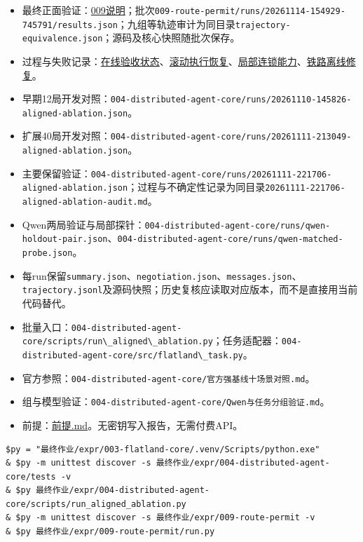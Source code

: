 \begin{itemize}
\item
  最终正面验证：\href{../expr/009-route-permit/README.md}{009说明}；批次\passthrough{\lstinline!009-route-permit/runs/20261114-154929-745791/results.json!}；九组等轨迹审计为同目录\passthrough{\lstinline!trajectory-equivalence.json!}；源码及核心快照随批次保存。
\item
  过程与失败记录：\href{../expr/006-mpc-flatland/在线验收状态.md}{在线验收状态}、\href{../expr/006-mpc-flatland/滚动执行恢复验收.md}{滚动执行恢复}、\href{../expr/007-local-chain/README.md}{局部连锁能力}、\href{../expr/008-flatland-local-repair/README.md}{铁路离线修复}。
\item
  早期12局开发对照：\passthrough{\lstinline!004-distributed-agent-core/runs/20261110-145826-aligned-ablation.json!}。
\item
  扩展40局开发对照：\passthrough{\lstinline!004-distributed-agent-core/runs/20261111-213049-aligned-ablation.json!}。
\item
  主要保留验证：\passthrough{\lstinline!004-distributed-agent-core/runs/20261111-221706-aligned-ablation.json!}；过程与不确定性记录为同目录\passthrough{\lstinline!20261111-221706-aligned-ablation-audit.md!}。
\item
  Qwen两局验证与局部探针：\passthrough{\lstinline!004-distributed-agent-core/runs/qwen-holdout-pair.json!}、\passthrough{\lstinline!004-distributed-agent-core/runs/qwen-matched-probe.json!}。
\item
  每run保留\passthrough{\lstinline!summary.json!}、\passthrough{\lstinline!negotiation.json!}、\passthrough{\lstinline!messages.json!}、\passthrough{\lstinline!trajectory.jsonl!}及源码快照；历史复核应读取对应版本，而不是直接用当前代码替代。
\item
  批量入口：\passthrough{\lstinline!004-distributed-agent-core/scripts/run\_aligned\_ablation.py!}；任务适配器：\passthrough{\lstinline!004-distributed-agent-core/src/flatland\_task.py!}。
\item
  官方参照：\passthrough{\lstinline!004-distributed-agent-core/官方强基线十场景对照.md!}。
\item
  组与模型验证：\passthrough{\lstinline!004-distributed-agent-core/Qwen与任务分组验证.md!}。
\item
  前提：\href{../expr/前提.md}{前提.md}。无密钥写入报告，无需付费API。
\end{itemize}

\begin{lstlisting}
$py = "最终作业/expr/003-flatland-core/.venv/Scripts/python.exe"
& $py -m unittest discover -s 最终作业/expr/004-distributed-agent-core/tests -v
& $py 最终作业/expr/004-distributed-agent-core/scripts/run_aligned_ablation.py
& $py -m unittest discover -s 最终作业/expr/009-route-permit -v
& $py 最终作业/expr/009-route-permit/run.py
\end{lstlisting}


